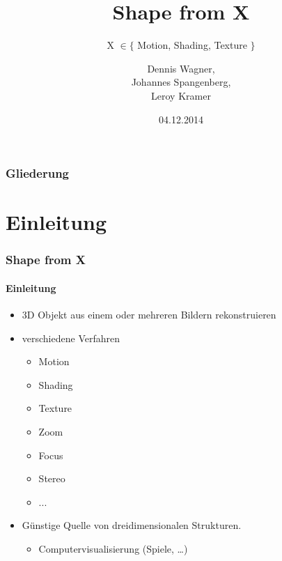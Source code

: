 \documentclass{beamer}
\title{Shape from X}
\subtitle{X $\in \{$ Motion, Shading, Texture $\}$}
\author{Dennis Wagner, \\ Johannes Spangenberg, \\ Leroy Kramer}
\date{04.12.2014}
\begin{document}
\begin{acronym}[SIFT]
\end{acronym}


\frame{\titlepage} 


\begin{frame}
	\frametitle{Gliederung}
	\tableofcontents
\end{frame} 


\section{Einleitung} 
\begin{frame}
	\frametitle{Shape from X}
	\framesubtitle{Einleitung}
	
	\begin{itemize}
		\item 3D Objekt aus einem oder mehreren Bildern rekonstruieren
		\item verschiedene Verfahren
		\begin{itemize}
			\item Motion
			\item Shading
			\item Texture
			\item Zoom
			\item Focus
			\item Stereo
			\item ...
		\end{itemize}
		\item Günstige Quelle von dreidimensionalen Strukturen.
		\begin{itemize}
			\item Computervisualisierung (Spiele, \dots)
		\end{itemize}
		
	\end{itemize}
\end{frame}

\end{document}
